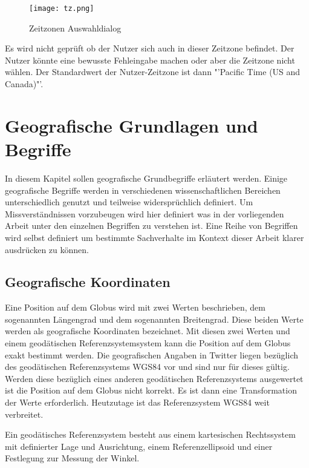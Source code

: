 				\begin{figure}[!ht]
					\begin{center}
						\texttt{[image: tz.png]}
						\caption{Zeitzonen Auswahldialog}
						\label{img:twitterTZ}
					\end{center}
				\end{figure}	

				Es wird nicht geprüft ob der Nutzer sich auch in dieser Zeitzone befindet.
				Der Nutzer könnte eine bewusste Fehleingabe machen oder aber die Zeitzone nicht wählen.
				Der Standardwert der Nutzer-Zeitzone ist dann "'Pacific Time (US and Canada)"'.

	\section{Geografische Grundlagen und Begriffe}
	
		In diesem Kapitel sollen geografische Grundbegriffe erläutert werden. 
		Einige geografische Begriffe werden in verschiedenen wissenschaftlichen Bereichen unterschiedlich genutzt und teilweise widersprüchlich definiert. 
		Um Missverständnissen vorzubeugen wird hier definiert was in der vorliegenden Arbeit unter den einzelnen Begriffen zu verstehen ist.
		Eine Reihe von Begriffen wird selbst definiert um bestimmte Sachverhalte im Kontext dieser Arbeit klarer ausdrücken zu können. 

		\subsection{Geografische Koordinaten} 

			Eine Position auf dem Globus wird mit zwei Werten beschrieben, dem sogenannten Längengrad und dem sogenannten Breitengrad.
			Diese beiden Werte werden als geografische Koordinaten bezeichnet. 
			Mit diesen zwei Werten und einem geodätischen Referenzsystemsystem kann die Position auf dem Globus exakt bestimmt werden.  
			Die geografischen Angaben in Twitter liegen bezüglich des geodätischen Referenzsystems WGS84 vor und sind nur für dieses gültig.
			Werden diese bezüglich eines anderen geodätischen Referenzsystems ausgewertet ist die Position auf dem Globus nicht korrekt.
			Es ist dann eine Transformation der Werte erforderlich.
			Heutzutage ist das Referenzsystem WGS84 weit verbreitet.

			Ein geodätisches Referenzsystem besteht aus einem kartesischen Rechtssystem mit definierter Lage und Ausrichtung, einem Referenzellipsoid und einer Festlegung zur Messung der Winkel.

